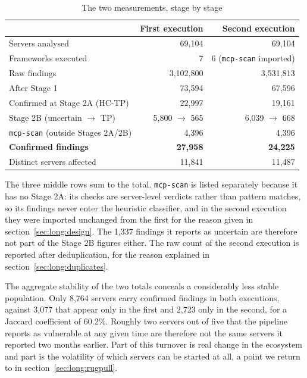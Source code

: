 \begin{table}[htbp]
\centering
\caption{The two measurements, stage by stage}
\label{tab:long:funnel}
\begin{tabular}{lrr}
\toprule
 & First execution & Second execution \\
\midrule
Servers analysed              & 69,104      & 69,104 \\
Frameworks executed           & 7           & 6 (\texttt{mcp-scan} imported) \\
Raw findings                  & 3,102,800   & 3,531,813 \\
After Stage 1                 & 73,594      & 67,596 \\
\midrule
Confirmed at Stage 2A (HC-TP) & 22,997      & 19,161 \\
Stage 2B (uncertain $\to$ TP) & 5,800 $\to$ 565 & 6,039 $\to$ 668 \\
\texttt{mcp-scan} (outside Stages 2A/2B) & 4,396 & 4,396 \\
\midrule
\textbf{Confirmed findings}   & \textbf{27,958} & \textbf{24,225} \\
Distinct servers affected     & 11,841      & 11,487 \\
\bottomrule
\end{tabular}

\vspace{2mm}
\footnotesize
The three middle rows sum to the total. \texttt{mcp-scan} is listed separately
because it has no Stage 2A: its checks are server-level verdicts rather than
pattern matches, so its findings never enter the heuristic classifier, and in the
second execution they were imported unchanged from the first for the reason given
in section~\ref{sec:long:design}. The 1,337 findings it reports as uncertain are
therefore not part of the Stage 2B figures either. The raw count of the second
execution is reported after deduplication, for the reason explained in
section~\ref{sec:long:duplicates}.
\end{table}

The aggregate stability of the two totals conceals a considerably less stable
population. Only 8,764 servers carry confirmed findings in both executions,
against 3,077 that appear only in the first and 2,723 only in the second, for a
Jaccard coefficient of 60.2\%. Roughly two servers out of five that the pipeline
reports as vulnerable at any given time are therefore not the same servers it
reported two months earlier. Part of this turnover is real change in the
ecosystem and part is the volatility of which servers can be started at all, a
point we return to in section~\ref{sec:long:rugpull}.

